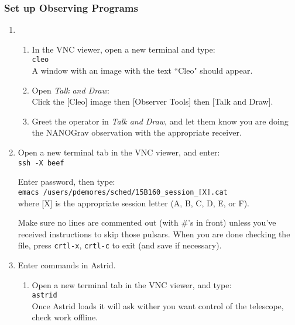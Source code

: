 \documentclass[11pt, reqno, tbtags]{article}
\begin{document}
\subsubsection{Set up Observing Programs}\label{VNC:stuff} %
\begin{enumerate}
 \item \begin{enumerate} %
  \item\label{cleo:stuff} In the VNC viewer, open a new terminal and type: \\ %
  \texttt{cleo} \\
  A window with an image with the text ``Cleo" should appear. 
  \item Open \textit{Talk and Draw}: \\
  Click the [Cleo] image then [Observer Tools] then [Talk and Draw]. %
  \item Greet the operator in \textit{Talk and Draw}, and let them know you are doing the NANOGrav observation with the appropriate receiver.  %
 \end{enumerate}
 \item Open a new terminal tab in the VNC viewer, and enter: \\  %
 \texttt{ssh -X beef} 
 
 Enter password, then type: \\
 \texttt{emacs /users/pdemores/sched/15B160\_session\_[X].cat} \\                         
 where [X] is the appropriate session letter (A, B, C, D, E, or F).                                

 Make sure no lines are commented out (with \#'s in front) unless you've received instructions to skip those pulsars. When you are done checking the file, press \texttt{crtl-x}, \texttt{crtl-c} to exit (and save if necessary).  

 \item Enter commands in Astrid. \begin{enumerate}  %
  \item Open a new terminal tab in the VNC viewer, and type: \\  %
  \texttt{astrid} \\
  Once Astrid loads it will ask wither you want control of the telescope, check work offline.


\end{enumerate}
\end{enumerate}
\end{document}
